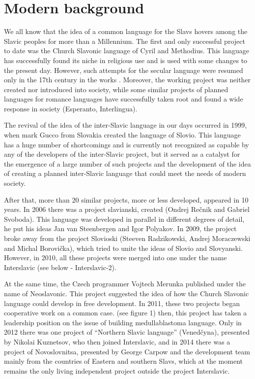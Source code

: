 \section{Modern background}

We all know that the idea of a common language for the Slavs hovers among the Slavic peoples for more than a Millennium. The first and only successful project to date was the Church Slavonic language of Cyril and Methodius. This language has successfully found its niche in religious use and is used with some changes to the present day. However, such attempts for the secular language were resumed only in the 17th century in the works \cite{krizhanich} \cite{matija}. Moreover, the working project was neither created nor introduced into society, while some similar projects of planned languages for romance languages have successfully taken root and found a wide response in society (Esperanto, Interlingua).

The revival of the idea of the inter-Slavic language in our days occurred in 1999, when mark Gucco from Slovakia created the language of Slovio. This language has a huge number of shortcomings and is currently not recognized as capable by any of the developers of the inter-Slavic project, but it served as a catalyst for the emergence of a large number of such projects and the development of the idea of creating a planned inter-Slavic language that could meet the needs of modern society. 

After that, more than 20 similar projects, more or less developed, appeared in 10 years. In 2006 there was a project slavianski, created (Ondrej Rečnik and Gabriel Svoboda). This language was developed in parallel in different degrees of detail, he put his ideas Jan van Steenbergen and Igor Polyakov. In 2009, the project broke away from the project Slovioski (Steeven Radzikowski, Andrej Moraczewski and Michal Borovička), which tried to unite the ideas of Slovio and Slovyanski. However, in 2010, all these projects were merged into one under the name Interslavic (see below - Interslavic-2).

At the same time, the Czech programmer Vojtech Merunka published under the name of Neoslavonic. This project suggested the idea of how the Church Slavonic language could develop in free development. In 2011, these two projects began cooperative work on a common case. (see figure 1) then, this project has taken a leadership position on the issue of building medullablastoma language. Only in 2012 there was one project of “Northern Slavic language” (Venedčyna), presented by Nikolai Kuznetsov, who then joined Interslavic, and in 2014 there was a project of Novoslovnitsa, presented by George Carpow and the development team mainly from the countries of Eastern and southern Slavs, which at the moment remains the only living independent project outside the project Interslavic.

